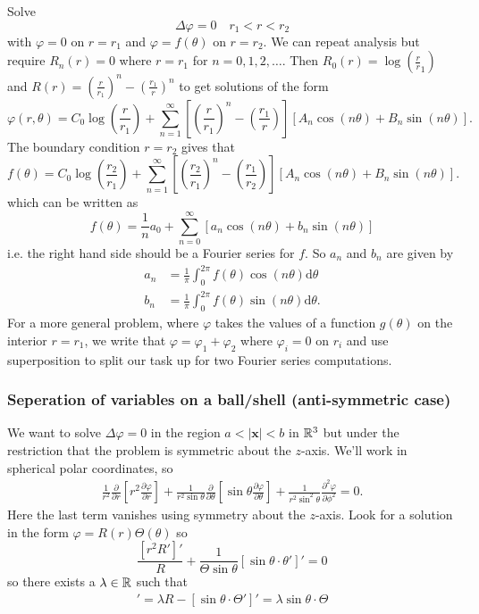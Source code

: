 \documentclass{article}
\begin{document}
Solve
\[
  \Delta\varphi=0\quad r_1<r<r_2
\]
with $ \varphi=0 $ on $ r=r_1 $ and $ \varphi=f(\theta) $ on $ r=r_2 $. We can repeat analysis but require $ R_n(r)=0 $ where $ r=r_1 $ for $ n=0,1,2,\dots $. Then $ R_0(r)=\log\left(\frac rr_1\right) $ and $ R(r)=\left(\frac r{r_1}\right)^n-\left(\frac{r_1}r\right)^n $ to get solutions of the form
\[
	\varphi(r,\theta)=C_0\log\left(\frac r{r_1}\right)+\sum_{n=1}^\infty \left[\left(\frac r{r_1}\right)^n-\left(\frac{r_1}r\right)\right]\left[A_n\cos(n\theta)+B_n\sin(n\theta)\right].
\]
The boundary condition $ r=r_2 $ gives that
\[
	f(\theta)=C_0\log\left(\frac {r_2}{r_1}\right)+\sum_{n=1}^\infty \left[\left(\frac {r_2}{r_1}\right)^n-\left(\frac{r_1}{r_2}\right)\right]\left[A_n\cos(n\theta)+B_n\sin(n\theta)\right].
\]
which can be written as
\[
	f(\theta)=\frac 1na_0+\sum_{n=0}^\infty \left[ a_n\cos(n\theta) + b_n\sin(n\theta)\right]
\]
i.e. the right hand side should be a Fourier series for $ f $. So $ a_n $ and $ b_n $ are given by
\begin{align*}
	a_n&=\frac 1\pi\int_0^{2\pi} f(\theta)\cos(n\theta)\mathrm d\theta \\
	b_n&= \frac 1\pi\int_0^{2\pi} f(\theta)\sin(n\theta)\mathrm d\theta.
\end{align*}
For a more general problem, where $ \varphi $ takes the values of a function $ g(\theta) $ on the interior $ r=r_1 $, we write that $ \varphi=\varphi_1+\varphi_2 $ where $ \varphi_i=0 $ on $ r_i $ and use superposition to split our task up for two Fourier series computations.
\subsubsection{Seperation of variables on a ball/shell (anti-symmetric case)}
We want to solve $ \Delta\varphi=0 $ in the region $ a<|\mathbf x|<b  $ in $ \mathbb{R}^3 $ but under the restriction that the problem is symmetric about the $ z $-axis. We'll work in spherical polar coordinates, so
\begin{align*}
	\frac 1{r^2}\frac\partial{\partial r}\left[r^2\frac{\partial \varphi}{\partial r}\right]+\frac 1{r^2\sin\theta}\frac{\partial}{\partial \theta}\left[\sin\theta\frac{\partial \varphi}{\partial\theta}\right]+\frac{1}{r^2\sin^2\theta}\frac{\partial^2\varphi}{\partial \phi^2}=0.
\end{align*}
Here the last term vanishes using symmetry about the $ z $-axis. Look for a solution in the form $ \varphi=R(r)\Theta(\theta) $ so
\[
	\frac{[r^2R']'}R+\frac1 {\Theta\sin\theta}[\sin\theta\cdot\theta']'=0
\]
so there exists a $ \lambda\in\mathbb{R} $ such that
\begin{align*}
	[r^2R']'=\lambda R-[\sin\theta\cdot \Theta']'=\lambda\sin\theta\cdot\Theta
\end{align*}
\end{document}
